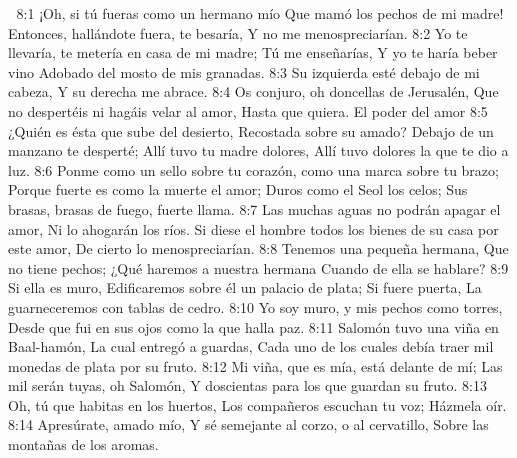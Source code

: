 
8:1 ¡Oh, si tú fueras como un hermano mío  
Que mamó los pechos de mi madre!  
Entonces, hallándote fuera, te besaría,  
Y no me menospreciarían.  
8:2 Yo te llevaría, te metería en casa de mi madre;  
Tú me enseñarías,  
Y yo te haría beber vino  
Adobado del mosto de mis granadas.  
8:3 Su izquierda esté debajo de mi cabeza,  
Y su derecha me abrace.  
8:4 Os conjuro, oh doncellas de Jerusalén,  
Que no despertéis ni hagáis velar al amor,  
Hasta que quiera.  
El poder del amor  
8:5 ¿Quién es ésta que sube del desierto,  
Recostada sobre su amado?  
Debajo de un manzano te desperté;  
Allí tuvo tu madre dolores,  
Allí tuvo dolores la que te dio a luz.  
8:6 Ponme como un sello sobre tu corazón, como una marca sobre tu brazo;  
Porque fuerte es como la muerte el amor;  
Duros como el Seol los celos;  
Sus brasas, brasas de fuego, fuerte llama.  
8:7 Las muchas aguas no podrán apagar el amor,  
Ni lo ahogarán los ríos.  
Si diese el hombre todos los bienes de su casa por este amor,  
De cierto lo menospreciarían.  
8:8 Tenemos una pequeña hermana,  
Que no tiene pechos;  
¿Qué haremos a nuestra hermana  
Cuando de ella se hablare?  
8:9 Si ella es muro,  
Edificaremos sobre él un palacio de plata;  
Si fuere puerta,  
La guarneceremos con tablas de cedro.  
8:10 Yo soy muro, y mis pechos como torres,  
Desde que fui en sus ojos como la que halla paz.  
8:11 Salomón tuvo una viña en Baal-hamón,  
La cual entregó a guardas,  
Cada uno de los cuales debía traer mil monedas de plata por su fruto.  
8:12 Mi viña, que es mía, está delante de mí;  
Las mil serán tuyas, oh Salomón,  
Y doscientas para los que guardan su fruto.  
8:13 Oh, tú que habitas en los huertos,  
Los compañeros escuchan tu voz;  
Házmela oír.  
8:14 Apresúrate, amado mío,  
Y sé semejante al corzo, o al cervatillo,  
Sobre las montañas de los aromas.


